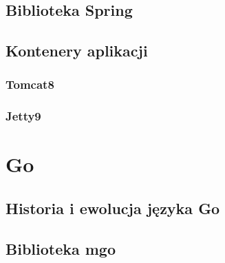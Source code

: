 \subsection{Biblioteka Spring}
\subsection{Kontenery aplikacji}
\subsubsection{Tomcat8}
\subsubsection{Jetty9}

\section{Go}
\subsection{Historia i ewolucja języka Go}
\subsection{Biblioteka mgo}
